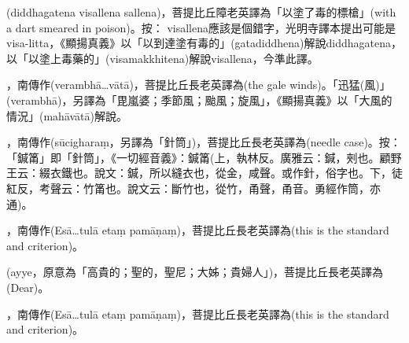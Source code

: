 \startitemgroup[noteitems]
\item{}(diddhagatena visallena sallena)，菩提比丘障老英譯為「以塗了毒的標槍」(with a dart smeared in poison)。按： visallena應該是個錯字，光明寺譯本提出可能是visa-litta，《顯揚真義》以「以到達塗有毒的」(gatadiddhena)解說diddhagatena，以「以塗上毒藥的」(visamakkhitena)解說visallena，今準此譯。
\stopitemgroup

\startitemgroup[noteitems]
\item{}，南傳作(verambhā…vātā)，菩提比丘長老英譯為(the gale winds)。「迅猛(風)」(verambhā)，另譯為「毘嵐婆；季節風；颱風；旋風」，《顯揚真義》以「大風的情況」(mahāvātā)解說。
\stopitemgroup

\startitemgroup[noteitems]
\item{}，南傳作(sūcigharaṃ，另譯為「針筒」)，菩提比丘長老英譯為(needle case)。按：「鍼筩」即「針筒」，《一切經音義》：鍼筩(上，執林反。廣雅云：鍼，㓨也。顧野王云：綴衣鐵也。說文：鍼，所以縫衣也，從金，咸聲。或作針，俗字也。下，徒紅反，考聲云：竹筩也。說文云：斷竹也，從竹，甬聲，甬音。勇經作筒，亦通)。
\stopitemgroup

\startitemgroup[noteitems]
\item{}，南傳作(Esā…tulā etaṃ pamāṇaṃ)，菩提比丘長老英譯為(this is the standard and criterion)。
\stopitemgroup

\startitemgroup[noteitems]
\item{}(ayye，原意為「高貴的；聖的，聖尼；大姊；貴婦人」)，菩提比丘長老英譯為(Dear)。
\stopitemgroup

\startitemgroup[noteitems]
\item{}，南傳作(Esā…tulā etaṃ pamāṇaṃ)，菩提比丘長老英譯為(this is the standard and criterion)。
\stopitemgroup

